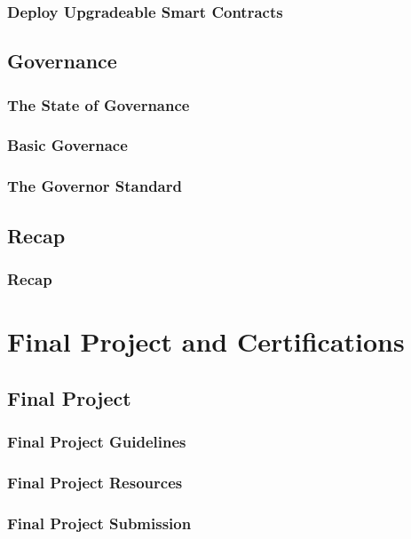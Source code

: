\documentclass[a4paper, oneside]{book}
\begin{document}
\subsection{Deploy Upgradeable Smart Contracts}

\section{Governance}
\subsection{The State of Governance}
\subsection{Basic Governace}
\subsection{The Governor Standard}

\section{Recap}
\subsection{Recap}


\chapter{Final Project and Certifications}

\section{Final Project}
\subsection{Final Project Guidelines}
\subsection{Final Project Resources}
\subsection{Final Project Submission}
\end{document}
